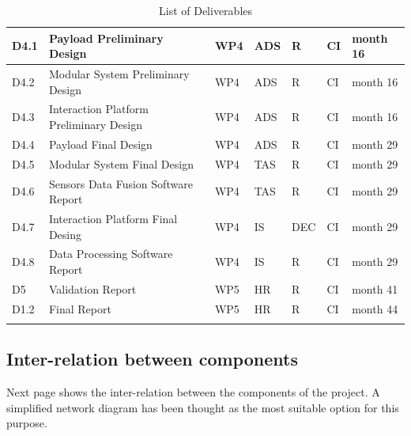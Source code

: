 \begin{longtable}[H]{p{1.8cm} p{2cm} p{1.3cm} p{1.8cm} p{1.3cm} p{2.1cm} p{1.8cm}}
	\midrule

 	D4.1 & Payload Preliminary Design  & WP4 & ADS & R & CI & month 16 \vspace{0.2cm} \\

 	\midrule

	D4.2 & Modular System Preliminary Design & WP4 & ADS & R & CI & month 16 \vspace{0.2cm} \\
	
	\midrule
	
	D4.3 & Interaction Platform Preliminary Design  & WP4 & ADS & R & CI & month 16 \vspace{0.2cm} \\

	\midrule

 	D4.4 & Payload Final Design & WP4 & ADS & R & CI & month 29  \vspace{0.2cm} \\

 	\midrule

	D4.5 & Modular System  Final Design & WP4 & TAS & R & CI & month 29  \vspace{0.2cm} \\
	
	\midrule
	
	D4.6 & Sensors Data Fusion Software Report  & WP4 & TAS & R & CI & month 29  \vspace{0.2cm} \\

	\midrule

 	D4.7 & Interaction Platform Final Desing  & WP4 & IS & DEC & CI & month 29 \vspace{0.2cm} \\

 	\midrule

	D4.8 & Data Processing Software Report & WP4 & IS & R & CI & month 29  \vspace{0.2cm} \\
	
	\midrule
	
	D5 & Validation Report & WP5 & HR & R & CI & month 41  \vspace{0.2cm} \\

	\midrule

 	D1.2 & Final Report & WP5 & HR & R & CI & month 44 \vspace{0.2cm} \\
	
	\bottomrule[2pt]
	
	\caption{List of Deliverables}
	\label{Deliverables}
\end{longtable}


\subsection{Inter-relation between components}

Next page shows the inter-relation between the components of the project. A simplified network diagram has been thought as the most suitable option for this purpose. 


